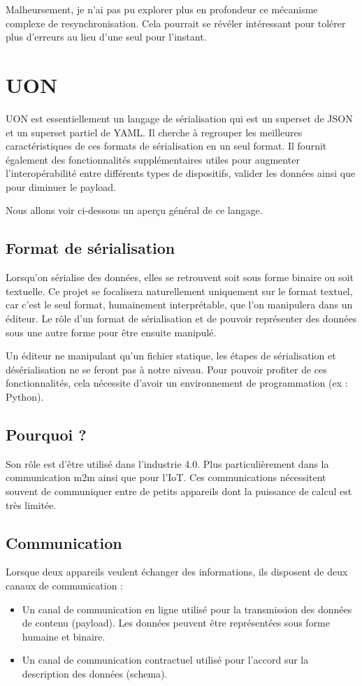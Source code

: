 \documentclass[
    iict, %
    il, %
]{heig-tb}
\begin{document}
Malheursement, je n'ai pas pu explorer plus en profondeur ce mécanisme complexe de resynchronisation.
Cela pourrait se révéler intéressant pour tolérer plus d'erreurs au lieu d'une seul pour l'instant.

\section{UON}

UON est essentiellement un langage de sérialisation qui est un superset de JSON et un superset partiel de YAML.
Il cherche à regrouper les meilleures caractéristiques de ces formats de sérialisation en un seul format.
Il fournit également des fonctionnalités supplémentaires utiles pour augmenter l'interopérabilité entre différents types de dispositifs, valider les données ainsi que pour diminuer le payload.

Nous allons voir ci-dessous un aperçu général de ce langage.

\subsection{Format de sérialisation}

Lorsqu'on sérialise des données, elles se retrouvent soit sous forme binaire ou soit textuelle.
Ce projet se focalisera naturellement uniquement sur le format textuel, car c'est le seul format, humainement interprétable, que l'on manipulera dans un éditeur.
Le rôle d'un format de sérialisation et de pouvoir représenter des données sous une autre forme pour être ensuite manipulé.

Un éditeur ne manipulant qu'un fichier statique, les étapes de sérialisation et désérialisation ne se feront pas à notre niveau.
Pour pouvoir profiter de ces fonctionnalités, cela nécessite d'avoir un environnement de programmation (ex : Python).


\subsection{Pourquoi ?}
Son rôle est d'être utilisé dans l'industrie 4.0. Plus particulièrement dans la communication \Gls{m2m} ainsi que pour l'\Gls{IoT}.
Ces communications nécessitent souvent de communiquer entre de petits appareils dont la puissance de calcul est très limitée.

\subsection{Communication}
Lorsque deux appareils veulent échanger des informations, ils disposent de deux canaux de communication :
\begin{itemize}
    \item Un canal de communication en ligne utilisé pour la transmission des données de contenu (payload). Les données peuvent être représentées sous forme humaine et binaire.
    \item Un canal de communication contractuel utilisé pour l'accord sur la description des données (schema).
\end{itemize}
\end{document}
